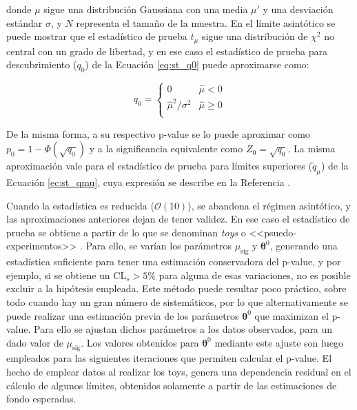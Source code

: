 \noindent
donde $\mu$ sigue una distribución Gaussiana con una media $\mu'$ y una desviación estándar $\sigma$, y $N$ representa el tamaño de la muestra. 
En el límite asintótico se puede mostrar que el estadístico de prueba $t_{\mu}$ sigue una distribución de $\chi^{2}$ no central con un grado de libertad, y en ese caso el estadístico de prueba para descubrimiento ($q_{0}$) de la Ecuación \ref{eq:st_q0} puede aproximarse como:

\begin{equation}
	q_{0}=
	\begin{cases}
		0 & \hat{\mu}<0 \\
		\hat{\mu}^{2}/\sigma^{2} & \hat{\mu}\ge 0 \\
	\end{cases}
\end{equation}

De la misma forma, a su respectivo p-value se lo puede aproximar como $p_{0}=1-\Phi(\sqrt{q_{0}})$ y a la significancia equivalente como $Z_{0}=\sqrt{q_{0}}$. La misma aproximación vale para el estadístico de prueba para límites superiores ($\tilde{q}_{\mu}$) de la Ecuación \ref{ec:st_qmu}, cuya expresión se describe en la Referencia \cite{Cowan:2010js}.

Cuando la estadística es reducida ($\mathcal{O}(10)$), se abandona el régimen asintótico, y las aproximaciones anteriores dejan de tener validez. En ese caso el estadístico de prueba se obtiene a partir de lo que se denominan \textit{toys} o <<psuedo-experimentos>> \cite{Baak:2014wma}. Para ello, se varían los parámetros $\mu_\text{sig}$ y $\bm{\theta}^0$, generando una estadística suficiente para tener una estimación conservadora del p-value, y por ejemplo, si se obtiene un $\text{CL}_{s}>5\%$ para alguna de esas variaciones, no es posible excluir a la hipótesis empleada. Este método puede resultar poco práctico, sobre todo cuando hay un gran número de sistemáticos, por lo que alternativamente se puede realizar una estimación previa de los parámetros $\bm{\theta}^0$ que maximizan el p-value. Para ello se ajustan dichos parámetros a los datos observados, para un dado valor de $\mu_\text{sig}$. Los valores obtenidos para $\bm{\theta}^0$ mediante este ajuste son luego empleados para las siguientes iteraciones que permiten calcular el p-value. El hecho de emplear datos al realizar los toys, genera una dependencia residual en el cálculo de algunos límites, obtenidos solamente a partir de las estimaciones de fondo esperadas.
 



